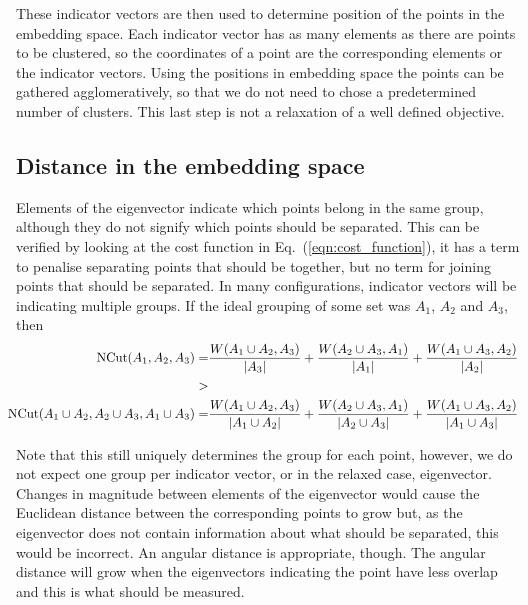 These indicator vectors are then used to determine position of the points in the embedding space.
Each indicator vector has as many elements as there are points to be clustered,
so the coordinates of a point are the corresponding elements or the indicator vectors.
Using the positions in embedding space the points can be gathered agglomeratively,
so that we do not need to chose a predetermined number of clusters.
This last step is not a relaxation of a well defined objective.

\subsection{Distance in the embedding space}\label{sec:embedding_distance}
Elements of the eigenvector indicate which points belong in the same group, although 
they do not signify which points should be separated.
This can be verified by looking at the cost function in Eq.~(\ref{eqn:cost_function}),
it has a term to penalise separating points that should be together, 
but no term for joining points that should be separated.
In many configurations, indicator vectors will be indicating multiple groups.
If the ideal grouping of some set was \(A_1\), \(A_2\) and \(A_3\),
then
\begin{equation}
\hspace*{-0.25truecm}
\begin{aligned}
    \text{NCut}(A_1, A_2, A_3) = &
    \frac{W(A_1\cup A_2, A_3)}{|A_3|} + \frac{W(A_2\cup A_3, A_1)}{|A_1|} + \frac{W(A_1\cup A_3, A_2)}{|A_2|} \\
    >& \\
    \text{NCut}(A_1\cup A_2, A_2\cup A_3, A_1\cup A_3) =&
    \frac{W(A_1\cup A_2, A_3)}{|A_1\cup A_2|} + \frac{W(A_2\cup A_3, A_1)}{|A_2\cup A_3|} + \frac{W(A_1\cup A_3, A_2)}{|A_1\cup A_3|} \\
\end{aligned}
\end{equation}

Note that this still uniquely determines the group for each point,
however, we do not expect one group per indicator vector, 
or in the relaxed case, eigenvector.
Changes in magnitude between elements of the eigenvector would cause the Euclidean distance between the corresponding points to grow
but, as the eigenvector does not contain information about what should be separated, this would be incorrect.
An angular distance is appropriate, though. 
The angular distance will grow when the eigenvectors indicating the point have less overlap
and this is what should be measured.

